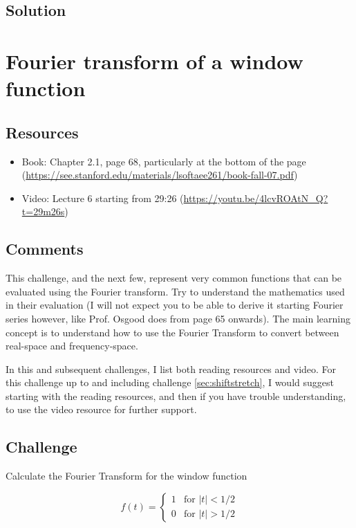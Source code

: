 \subsection*{Solution}




\newpage
\section{Fourier transform of a window function}
\label{sec:tophat}

\subsection*{Resources}
\begin{itemize}
    \item Book: Chapter 2.1, page 68, particularly at the bottom of the page (\url{https://see.stanford.edu/materials/lsoftaee261/book-fall-07.pdf})
    \item Video: Lecture 6 starting from 29:26 (\url{https://youtu.be/4lcvROAtN_Q?t=29m26s})
\end{itemize}

\subsection*{Comments}
This challenge, and the next few, represent very common functions that can be evaluated using the Fourier transform. Try to understand the mathematics used in their evaluation (I will not expect you to be able to derive it starting Fourier series however, like Prof. Osgood does from page 65 onwards). The main learning concept is to understand how to use the Fourier Transform to convert between real-space and frequency-space.

In this and subsequent challenges, I list both reading resources and video. For this challenge up to and including challenge \ref{sec:shiftstretch}, I would suggest starting with the reading resources, and then if you have trouble understanding, to use the video resource for further support.

\subsection*{Challenge}
Calculate the Fourier Transform for the window function

\begin{equation}
    f(t)=
    \begin{cases}
        1 & \text{for } |t| < 1/2 \\
        0 & \text{for } |t| > 1/2
    \end{cases}
\end{equation}

